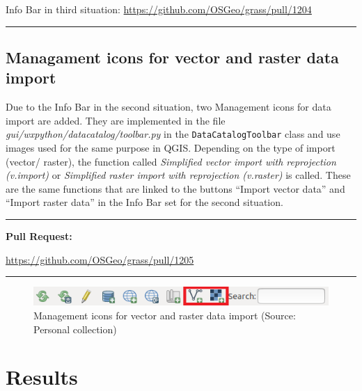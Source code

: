 \documentclass[a4paper,10pt,twoside]{article}
\begin{document}
Info Bar in third situation: \url{https://github.com/OSGeo/grass/pull/1204}
\par\noindent\rule{\textwidth}{0.4pt}

\subsection{Managament icons for vector and raster data import}

\noindent \large Due to the Info Bar in the second situation, two
Management icons for data import are added. They are implemented in
the file \textit{gui/wxpython/datacatalog/toolbar.py} in the
\texttt{DataCatalogToolbar} class and use images used for the same
purpose in QGIS. Depending on the type of import (vector/ raster), the
function called \textit{Simplified vector import with reprojection
  (v.import)} or \textit{Simplified raster import with reprojection
  (v.raster)} is called. These are the same functions that are linked
to the buttons ``Import vector data'' and ``Import raster data'' in
the Info Bar set for the second situation.

\par\noindent\rule{\textwidth}{0.4pt}
\textbf{Pull Request:}

\url{https://github.com/OSGeo/grass/pull/1205}
\par\noindent\rule{\textwidth}{0.4pt}

\vspace{0.3cm}
\begin{figure}[hbt!] 
\begin{center}
\includegraphics[width=15cm]{../pictures/icons.png} 
\caption[Management icons for vector and raster data
  import]{Management icons for vector and raster data import (Source:
  Personal collection)}
\label{fig:icons}
\end{center}
\end{figure}

\newpage
\vspace*{-1cm}
\section{Results}
\label{sec:results}
\noindent
\large
\end{document}
